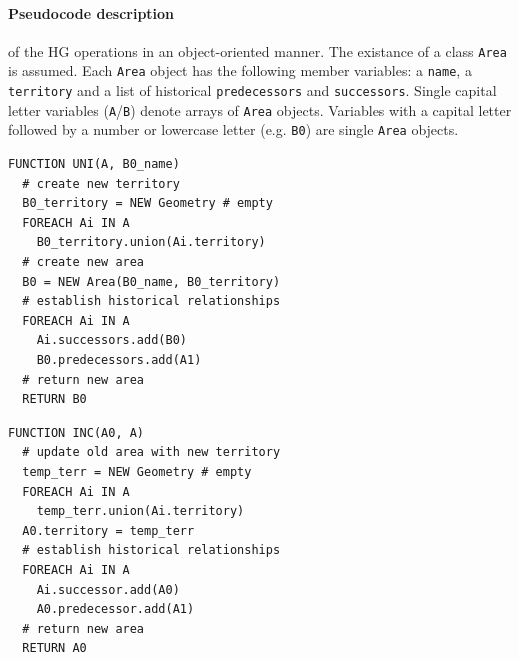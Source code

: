 \paragraph{Pseudocode description} %
\label{par:pseudocode_description}

of the HG operations in an object-oriented manner. The existance of a class \texttt{Area} is assumed. Each \texttt{Area} object has the following member variables: a \texttt{name}, a \texttt{territory} and a list of historical \texttt{predecessors} and \texttt{successors}. Single capital letter variables (\texttt{A}/\texttt{B}) denote arrays of \texttt{Area} objects. Variables with a capital letter followed by a number or lowercase letter (e.g. \texttt{B0}) are single \texttt{Area} objects.

\begin{minipage}[t]{0.47\textwidth}
\begin{lstlisting}[language=pseudocode,
  caption=Unification]
FUNCTION UNI(A, B0_name)
  # create new territory
  B0_territory = NEW Geometry # empty
  FOREACH Ai IN A
    B0_territory.union(Ai.territory)
  # create new area
  B0 = NEW Area(B0_name, B0_territory)
  # establish historical relationships
  FOREACH Ai IN A
    Ai.successors.add(B0)
    B0.predecessors.add(A1)
  # return new area
  RETURN B0
\end{lstlisting}
\end{minipage}    %
\hspace{3.0em}    %
\begin{minipage}[t]{0.47\textwidth}
\begin{lstlisting}[language=pseudocode,
  caption=Incorporation]
FUNCTION INC(A0, A)
  # update old area with new territory
  temp_terr = NEW Geometry # empty
  FOREACH Ai IN A
    temp_terr.union(Ai.territory)
  A0.territory = temp_terr
  # establish historical relationships
  FOREACH Ai IN A
    Ai.successor.add(A0)
    A0.predecessor.add(A1)
  # return new area
  RETURN A0
\end{lstlisting}
\end{minipage}

